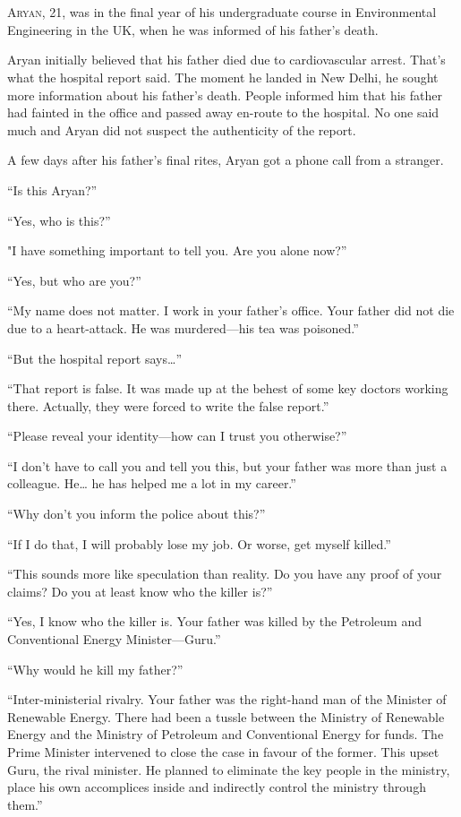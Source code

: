 \chapter{}

\lettrine{A}{ryan}, 21, was in the final year of his undergraduate course
in Environmental Engineering in the UK, when he was informed of his father's
death.

Aryan initially believed that his father died due to cardiovascular arrest.
That's what the hospital report said. The moment he landed in New Delhi, he
sought more information about his father's death. People informed him that his
father had fainted in the office and passed away en-route to the hospital. No
one said much and Aryan did not suspect the authenticity of the report.

A few days after his father's final rites, Aryan got a phone call from a stranger.

“Is this Aryan?”

“Yes, who is this?”

"I have something important to tell you. Are you alone now?”

“Yes, but who are you?”

“My name does not matter. I work in your father's office. Your father did not
die due to a heart-attack. He was murdered—his tea was poisoned.”

“But the hospital report says…”

“That report is false. It was made up at the behest of some key doctors working
there. Actually, they were forced to write the false report.”

“Please reveal your identity—how can I trust you otherwise?”

“I don't have to call you and tell you this, but your father was more than just
a colleague. He… he has helped me a lot in my career.”

“Why don't you inform the police about this?”

“If I do that, I will probably lose my job. Or worse, get myself killed.”

“This sounds more like speculation than reality. Do you have any proof of your
claims? Do you at least know who the killer is?”

“Yes, I know who the killer is. Your father was killed by the Petroleum and
Conventional Energy Minister—Guru.”

“Why would he kill my father?”

“Inter-ministerial rivalry. Your father was the right-hand man of the Minister
of Renewable Energy. There had been a tussle between the Ministry of Renewable Energy
and the Ministry of Petroleum and Conventional Energy for funds. The Prime Minister
intervened to close the case in favour of the former. This
upset Guru, the rival minister. He planned to eliminate the key people in the
ministry, place his own accomplices inside and indirectly
control the ministry through them.”

